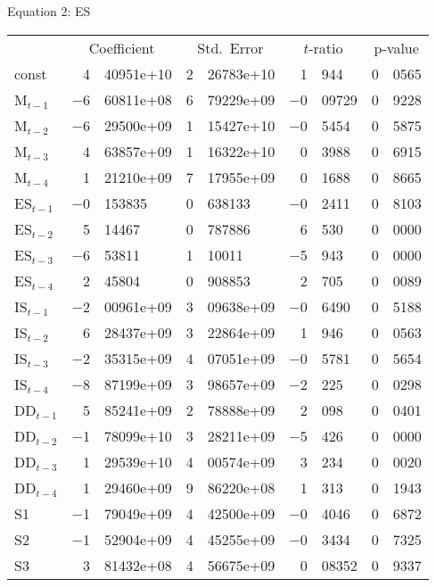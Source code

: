 \documentclass[11pt]{article}
\begin{document}
\begin{center}

Equation 2: ES\\

\vspace{1em}

\begin{tabular}{lr@{.}lr@{.}lr@{.}lr@{.}l}
  &
 \multicolumn{2}{c}{Coefficient} &
  \multicolumn{2}{c}{Std.\ Error} &
   \multicolumn{2}{c}{$t$-ratio} &
    \multicolumn{2}{c}{p-value} \\[1ex]
const &
  4&40951\textrm{e+10} &
    2&26783\textrm{e+10} &
      1&944 &
        0&0565 \\
M$_{t-1}$ &
  $-$6&60811\textrm{e+08} &
    6&79229\textrm{e+09} &
      $-$0&09729 &
        0&9228 \\
M$_{t-2}$ &
  $-$6&29500\textrm{e+09} &
    1&15427\textrm{e+10} &
      $-$0&5454 &
        0&5875 \\
M$_{t-3}$ &
  4&63857\textrm{e+09} &
    1&16322\textrm{e+10} &
      0&3988 &
        0&6915 \\
M$_{t-4}$ &
  1&21210\textrm{e+09} &
    7&17955\textrm{e+09} &
      0&1688 &
        0&8665 \\
ES$_{t-1}$ &
  $-$0&153835 &
    0&638133 &
      $-$0&2411 &
        0&8103 \\
ES$_{t-2}$ &
  5&14467 &
    0&787886 &
      6&530 &
        0&0000 \\
ES$_{t-3}$ &
  $-$6&53811 &
    1&10011 &
      $-$5&943 &
        0&0000 \\
ES$_{t-4}$ &
  2&45804 &
    0&908853 &
      2&705 &
        0&0089 \\
IS$_{t-1}$ &
  $-$2&00961\textrm{e+09} &
    3&09638\textrm{e+09} &
      $-$0&6490 &
        0&5188 \\
IS$_{t-2}$ &
  6&28437\textrm{e+09} &
    3&22864\textrm{e+09} &
      1&946 &
        0&0563 \\
IS$_{t-3}$ &
  $-$2&35315\textrm{e+09} &
    4&07051\textrm{e+09} &
      $-$0&5781 &
        0&5654 \\
IS$_{t-4}$ &
  $-$8&87199\textrm{e+09} &
    3&98657\textrm{e+09} &
      $-$2&225 &
        0&0298 \\
DD$_{t-1}$ &
  5&85241\textrm{e+09} &
    2&78888\textrm{e+09} &
      2&098 &
        0&0401 \\
DD$_{t-2}$ &
  $-$1&78099\textrm{e+10} &
    3&28211\textrm{e+09} &
      $-$5&426 &
        0&0000 \\
DD$_{t-3}$ &
  1&29539\textrm{e+10} &
    4&00574\textrm{e+09} &
      3&234 &
        0&0020 \\
DD$_{t-4}$ &
  1&29460\textrm{e+09} &
    9&86220\textrm{e+08} &
      1&313 &
        0&1943 \\
S1 &
  $-$1&79049\textrm{e+09} &
    4&42500\textrm{e+09} &
      $-$0&4046 &
        0&6872 \\
S2 &
  $-$1&52904\textrm{e+09} &
    4&45255\textrm{e+09} &
      $-$0&3434 &
        0&7325 \\
S3 &
  3&81432\textrm{e+08} &
    4&56675\textrm{e+09} &
      0&08352 &
        0&9337 \\
\end{tabular}


\end{center}
\end{document}
